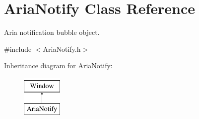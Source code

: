 \hypertarget{classAriaNotify}{}\section{Aria\+Notify Class Reference}
\label{classAriaNotify}


Aria notification bubble object.  




{\ttfamily \#include $<$Aria\+Notify.\+h$>$}

Inheritance diagram for Aria\+Notify\+:\begin{figure}[H]
\begin{center}
\leavevmode
\includegraphics[height=2.000000cm]{classAriaNotify}
\end{center}
\end{figure}
